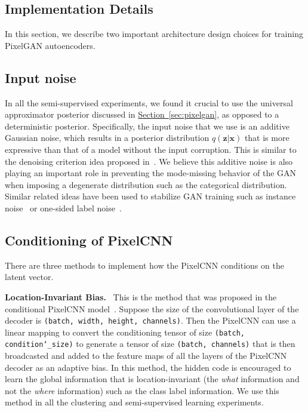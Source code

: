 \documentclass{article}
\newcommand{\mysec}[1]{\hyperref[sec:#1]{Section~\ref*{sec:#1}}}
\DeclareRobustCommand{\parhead}[1]{\textbf{#1}~}
\begin{document}
\begin{appendices}



\section{Implementation Details}\label{appendix:implementation}
In this section, we describe two important architecture design choices for training PixelGAN autoencoders.

\subsection{Input noise}
\label{appendix:input_noise}

In all the semi-supervised experiments, we found it crucial to use the universal approximator posterior discussed in \mysec{pixelgan}, as opposed to a deterministic posterior. Specifically, the input noise that we use is an additive Gaussian noise, which results in a posterior distribution $q(\mathbf{z}|\mathbf{x})$ that is more expressive than that of a model without the input corruption. This is similar to the denoising criterion idea proposed in~\citep{denoising-vae}. We believe this additive noise is also playing an important role in preventing the mode-missing behavior of the GAN when imposing a degenerate distribution such as the categorical distribution. Similar related ideas have been used to stabilize GAN training such as instance noise~\citep{instance} or one-sided label noise~\citep{improved-gan}.

\subsection{Conditioning of PixelCNN}
\label{appendix:conditioning_of_pixelcnn}

There are three methods to implement how the PixelCNN conditions on the latent vector.

\parhead{Location-Invariant Bias.} This is the method that was proposed in the conditional PixelCNN model~\citep{pixelcnn}. Suppose the size of the convolutional layer of the decoder is \texttt{(batch, width, height, channels)}. 
Then the PixelCNN can use a linear mapping to convert the conditioning tensor of size \texttt{(batch, condition\char`_size)} to generate a tensor of size \texttt{(batch, channels)} that is then broadcasted and added to the feature maps of all the layers of the PixelCNN decoder as an adaptive bias. In this method, the hidden code is encouraged to learn the global information that is location-invariant (the \emph{what} information and not the \emph{where} information) such as the class label information. We use this method in all the clustering and semi-supervised learning experiments. 



\end{appendices}
\end{document}
